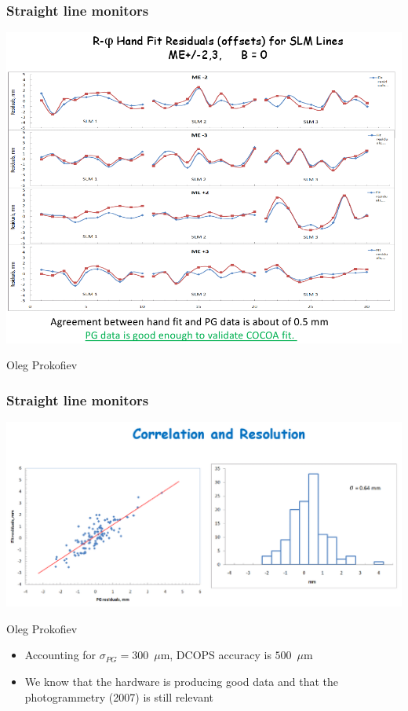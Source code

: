\documentclass[compress]{beamer}
\begin{document}
\begin{frame}
\frametitle{Straight line monitors}

\begin{center}
\includegraphics[width=0.9\linewidth]{oleg_hand_fit2.png}
\end{center}

\vspace{-0.5 cm}
\hfill Oleg Prokofiev
\end{frame}

\begin{frame}
\frametitle{Straight line monitors}
\begin{center}
\includegraphics[width=\linewidth]{oleg_hand_fit3.png}

\hfill Oleg Prokofiev
\end{center}

\vfill
\begin{itemize}
\item Accounting for $\sigma_{PG} = 300$~$\mu$m, DCOPS accuracy is $500$~$\mu$m

\item We know that the hardware is producing good data and that the photogrammetry (2007) is still relevant
\end{itemize}
\end{frame}
\end{document}

